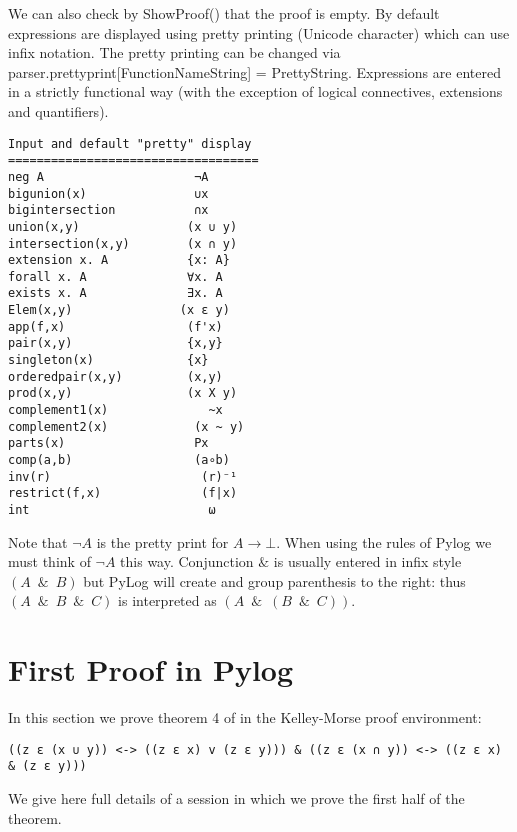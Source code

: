 \documentclass[a4paper,12pt,leqno]{article}
\numberwithin{equation}{section}
\begin{document}
We can also check by ShowProof() that the proof is empty. By default expressions are displayed using pretty printing (Unicode character) which can use infix notation.  The pretty printing can be changed via parser.prettyprint[FunctionNameString] = PrettyString. Expressions are entered in a strictly functional way (with the exception of logical connectives, extensions and quantifiers). 

\begin{verbatim}
Input and default "pretty" display
===================================
neg A                     ¬A  
bigunion(x)               ∪x
bigintersection           ∩x
union(x,y)               (x ∪ y)
intersection(x,y)        (x ∩ y)
extension x. A           {x: A}
forall x. A              ∀x. A
exists x. A              ∃x. A
Elem(x,y)               (x ε y)
app(f,x)                 (f'x)
pair(x,y)                {x,y}
singleton(x)             {x}
orderedpair(x,y)         (x,y)
prod(x,y)                (x X y)
complement1(x)              ~x
complement2(x)            (x ~ y)
parts(x)                  Px
comp(a,b)                 (a∘b) 
inv(r)                     (r)⁻¹ 
restrict(f,x)              (f|x)
int                         ω

\end{verbatim}

Note that $\neg A$ is the pretty print for $A\rightarrow \bot$. When using the rules of Pylog
we must think of $\neg A$ this way.
Conjunction $\&$ is usually entered in infix style $(A\enspace \& \enspace B)$ but PyLog will create and group parenthesis to the right: thus $(A \enspace \& \enspace B\enspace  \& \enspace C)$ is interpreted as $(A\enspace \& \enspace (B \enspace \& \enspace C))$.

\section*{First Proof in Pylog}

In this section we prove theorem 4 of \cite{kel} in the Kelley-Morse proof environment:
\begin{verbatim}
((z ε (x ∪ y)) <-> ((z ε x) v (z ε y))) & ((z ε (x ∩ y)) <-> ((z ε x) & (z ε y)))
\end{verbatim}

We give here full  details of a session in which we prove the first half of the theorem.
\end{document}
